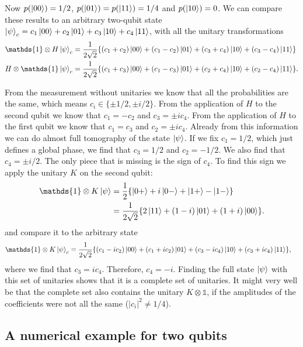 \documentclass[submission, Phys]{SciPost}
\begin{document}
Now $p(\ket{00}) = 1/2$, $p(\ket{01}) = p(\ket{11}) = 1/4$ and $p(\ket{10}) = 0$.
We can compare these results to an arbitrary two-qubit state $\ket{\psi}_c = c_1 \ket{00} +c_2 \ket{01} + c_3 \ket{10} +c_4 \ket{11}$,
with all the unitary transformations
\begin{align}
	\mathds{1} \otimes H \ket{\psi}_c & = \frac{1}{2\sqrt{2}} \{ (c_1+c_2) \ket{00} + (c_1 -c_2)\ket{01} + (c_3 + c_4)\ket{10} + (c_3-c_4)\ket{11} \}  \\
	H \otimes \mathds{1} \ket{\psi}_c & = \frac{1}{2\sqrt{2}} \{ (c_1+c_3) \ket{00} + (c_1 -c_3)\ket{01} + (c_2 + c_4)\ket{10} + (c_2-c_4)\ket{11} \}.
\end{align}

From the measurement without unitaries we know that all the probabilities are the same,
which means $c_i \in \{ \pm 1/2, \pm i/2 \}$.
From the application of $H$ to the second qubit we know that $c_1 = -c_2$ and $c_3 = \pm i c_4$.
From the application of $H$ to the first qubit we know that $c_1 = c_3$ and $c_2 = \pm i c_4$.
Already from this information we can do almost full tomography of the state $\ket{\psi}$.
If we fix $c_1 = 1/2$, which just defines a global phase, we find that $c_3 = 1/2$ and $c_2 = -1/2$.
We also find that $c_4 = \pm i/2$.
The only piece that is missing is the sign of $c_4$. To find this sign we apply the unitary $K$ on the second qubit:
\begin{align}
	\mathds{1} \otimes K \ket{\psi} & = \frac{1}{2} \{ \ket{0+} +i \ket{0-} + \ket{1+} - \ket{1-} \}           \\
	                                & = \frac{1}{2 \sqrt{2}} \{ 2 \ket{11} + (1-i)\ket{01} + (1+i)\ket{00} \}.
\end{align}
%
and compare it to the arbitrary state
%
\begin{align}
	\mathds{1} \otimes K \ket{\psi}_c & = \frac{1}{2\sqrt{2}} \{ (c_1-ic_2) \ket{00} + (c_1 +ic_2)\ket{01} + (c_3 -ic_4)\ket{10} + (c_3+ic_4)\ket{11} \},
\end{align}
%
where we find that $c_3 = ic_4$. Therefore, $c_4 = -i$.
Finding the full state $\ket{\psi}$ with this set of unitaries shows that it is a complete set of unitaries.
It might very well be that the complete set also contains the unitary $K \otimes \mathds{1}$,
if the amplitudes of the coefficients were not all the same ($|c_i|^2 \neq 1/4$).

\subsection{A numerical example for two qubits}
\end{document}
